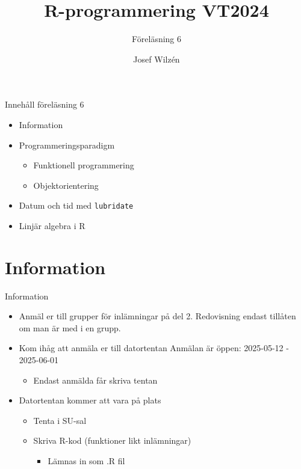\documentclass[
  11pt,
  ignorenonframetext,
  handout]{beamer}
\title{R-programmering VT2024}
\subtitle{Föreläsning 6}
\author{Josef Wilzén}
\date{}
\institute{Linköpings Universitet}
\providecommand{\tightlist}{%
  \setlength{\itemsep}{0pt}\setlength{\parskip}{0pt}}
\begin{document}
\frame{\titlepage}

\begin{frame}{Innehåll föreläsning 6}
\label{innehuxe5ll-fuxf6reluxe4sning-6}
\begin{itemize}
\tightlist
\item
  Information
\item
  Programmeringsparadigm

  \begin{itemize}
  \tightlist
  \item
    Funktionell programmering
  \item
    Objektorientering
  \end{itemize}
\item
  Datum och tid med \texttt{lubridate}
\item
  Linjär algebra i R
\end{itemize}
\end{frame}

\section{Information}\label{information}

\begin{frame}{Information}
\label{information-1}
\begin{itemize}
\tightlist
\item Anmäl er till grupper för inlämningar på del 2. Redovisning endast tillåten om man är med i en grupp.
\item
  Kom ihåg att anmäla er till datortentan Anmälan är öppen: 2025-05-12 - 2025-06-01

  \begin{itemize}
  \tightlist
  \item
    Endast anmälda får skriva tentan
  \end{itemize}
\item
  Datortentan kommer att vara på plats

  \begin{itemize}
  \tightlist
  \item
    Tenta i SU-sal
  \item
    Skriva R-kod (funktioner likt inlämningar)

    \begin{itemize}
    \tightlist
    \item
      Lämnas in som .R fil
    \end{itemize}
  \end{itemize}
\end{itemize}
\end{frame}
\end{document}

